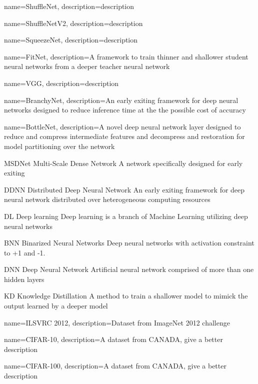{
	name={ShuffleNet},
	description={description}
}

{
	name={ShuffleNetV2},
	description={description}
}

{
	name={SqueezeNet},
	description={description}
}

{
	name={FitNet},
	description={A framework to train thinner and shallower student neural networks from a deeper teacher neural network}
}

{
	name={VGG},
	description={description}
}


{
	name={BranchyNet},
	description={An early exiting framework for deep neural networks designed to reduce inference time at the the possible cost of accuracy}
}

{
	name={BottleNet},
	description={A novel deep neural network layer designed to reduce and compress intermediate features and decompress and restoration for model partitioning over the network}
}

	{MSDNet}
	{Multi-Scale Dense Network}
	{A network specifically designed for early exiting}
	
	
	{DDNN}
	{Distributed Deep Neural Network}
	{An early exiting framework for deep neural network distributed over heterogeneous computing resources}
	
	{DL}
	{Deep learning}
	{Deep learning is a branch of Machine Learning utilizing deep neural networks}
	
	{BNN}
	{Binarized Neural Networks}
	{Deep neural networks with activation constraint to +1 and -1.}
	
	{DNN}
	{Deep Neural Network}
	{Artificial neural network comprised of more than one hidden layers}
	
	{KD}
	{Knowledge Distillation}
	{A method to train a shallower model to mimick the output learned by a deeper model}
	

{
	name={ILSVRC 2012},
	description={Dataset from ImageNet 2012 challenge}
}

{
	name={CIFAR-10},
	description={A dataset from CANADA, give a better description}
}

{
	name={CIFAR-100},
	description={A dataset from CANADA, give a better description}
}

